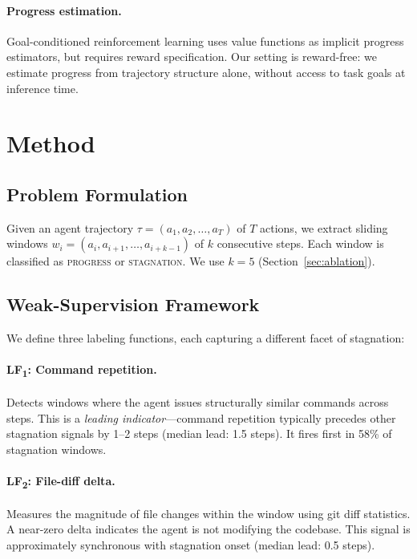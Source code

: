 \documentclass[11pt]{article}
\begin{document}
\paragraph{Progress estimation.}
Goal-conditioned reinforcement learning uses value functions as implicit progress estimators, but requires reward specification. Our setting is reward-free: we estimate progress from trajectory structure alone, without access to task goals at inference time.

\section{Method}
\label{sec:method}

\subsection{Problem Formulation}

Given an agent trajectory $\tau = (a_1, a_2, \ldots, a_T)$ of $T$ actions, we extract sliding windows $w_i = (a_i, a_{i+1}, \ldots, a_{i+k-1})$ of $k$ consecutive steps. Each window is classified as \textsc{progress} or \textsc{stagnation}. We use $k{=}5$ (Section~\ref{sec:ablation}).

\subsection{Weak-Supervision Framework}
\label{sec:framework}

We define three labeling functions, each capturing a different facet of stagnation:

\paragraph{LF\textsubscript{1}: Command repetition.}
Detects windows where the agent issues structurally similar commands across steps. This is a \emph{leading indicator}---command repetition typically precedes other stagnation signals by 1--2 steps (median lead: 1.5 steps). It fires first in 58\% of stagnation windows.

\paragraph{LF\textsubscript{2}: File-diff delta.}
Measures the magnitude of file changes within the window using git diff statistics. A near-zero delta indicates the agent is not modifying the codebase. This signal is approximately synchronous with stagnation onset (median lead: 0.5 steps).
\end{document}
